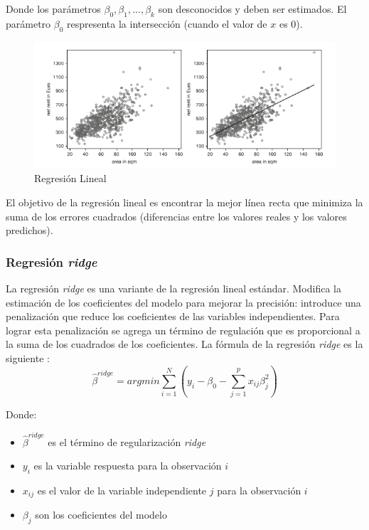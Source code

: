\documentclass[12pt,a4paper,Spanish]{article}
\begin{document}
Donde los parámetros $\beta_0, \beta_1, ..., \beta_k$ son desconocidos y deben ser estimados. El parámetro $\beta_0$ respresenta la intersección (cuando el valor de $x$ es 0).
\newline
\begin{figure}[H]
	\centering
	\includegraphics[width=0.7\linewidth]{figs/linear_regression}
	\caption{Regresión Lineal \cite{fahrmeir2013regression}}
	\label{fig:linearregression}
\end{figure}
El objetivo de la regresión lineal es encontrar la mejor línea recta que minimiza la suma de los errores cuadrados (diferencias entre los valores reales y los valores predichos).

\subsubsection{Regresión \textit{ridge}}
La regresión \textit{ridge} es una variante de la regresión lineal estándar. Modifica la estimación de los coeficientes del modelo para mejorar la precisión: introduce una penalización que reduce los coeficientes de las variables independientes. Para lograr esta penalización se agrega un término de regulación que es proporcional a la suma de los cuadrados de los coeficientes. La fórmula de la regresión \textit{ridge} es la siguiente \cite{hastie2009elements}:
\begin{equation}
	\hat{\beta}^{ridge} = argmin {\sum_{i=1}^{N}} (y_i - \beta_0 - \sum_{j=1}^{p}x_{ij}\beta^{2}_j)
\end{equation}

Donde:
\begin{itemize}
	\item $\hat{\beta}^{ridge}$ es el término de regularización \textit{ridge}
	\item $y_i$ es la variable respuesta para la observación $i$
	\item $x_{ij}$ es el valor de la variable independiente $j$ para la observación $i$
	\item $\beta_{j}$ son los coeficientes del modelo
\end{itemize}
\end{document}
